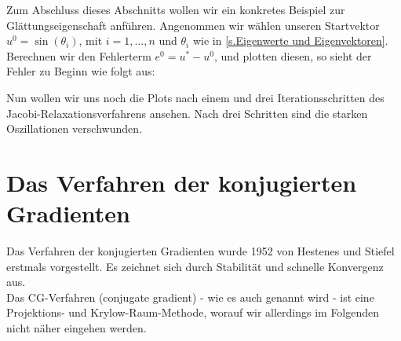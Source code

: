 \label{img.Jacobi3}

Zum Abschluss dieses Abschnitts wollen wir ein konkretes Beispiel zur Glättungseigenschaft anführen. Angenommen wir wählen unseren Startvektor $u^{0} = \sin(\theta_{i})$, mit $i = 1,...,n$ und $\theta_{i}$ wie in \autoref{s.Eigenwerte und Eigenvektoren}. Berechnen wir den Fehlerterm $e^{0} = u^{*} - u^{0}$, und plotten diesen, so sieht der Fehler zu Beginn wie folgt aus:


Nun wollen wir uns noch die Plots nach einem und drei Iterationsschritten des Jacobi-Relaxationsverfahrens ansehen. Nach drei Schritten sind die starken Oszillationen verschwunden.



\section{Das Verfahren der konjugierten Gradienten}\label{s.Das Verfahren der konjugierten Gradienten}

Das Verfahren der konjugierten Gradienten wurde 1952 von Hestenes und Stiefel erstmals vorgestellt. Es zeichnet sich durch Stabilität und schnelle Konvergenz aus. \\
Das CG-Verfahren (conjugate gradient) - wie es auch genannt wird - ist eine Projektions- und Krylow-Raum-Methode, worauf wir allerdings im Folgenden nicht näher eingehen werden.

